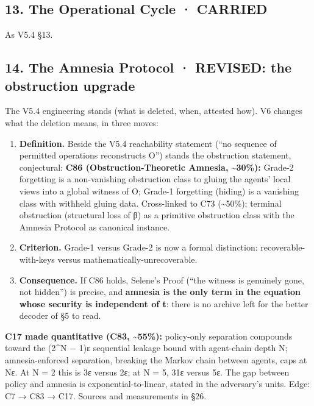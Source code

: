 \documentclass[
  11pt,
]{article}
\providecommand{\tightlist}{%
  \setlength{\itemsep}{0pt}\setlength{\parskip}{0pt}}
\begin{document}
\subsection{13. The Operational Cycle ·
CARRIED}\label{the-operational-cycle-carried}

As V5.4 §13.

\subsection{14. The Amnesia Protocol · REVISED: the obstruction
upgrade}\label{the-amnesia-protocol-revised-the-obstruction-upgrade}

The V5.4 engineering stands (what is deleted, when, attested how). V6
changes what the deletion means, in three moves:

\begin{enumerate}
\def\labelenumi{\arabic{enumi}.}
\tightlist
\item
  \textbf{Definition.} Beside the V5.4 reachability statement (``no
  sequence of permitted operations reconstructs O'') stands the
  obstruction statement, conjectural: \textbf{C86 (Obstruction-Theoretic
  Amnesia, \textasciitilde30\%):} Grade-2 forgetting is a non-vanishing
  obstruction class to gluing the agents' local views into a global
  witness of O; Grade-1 forgetting (hiding) is a vanishing class with
  withheld gluing data. Cross-linked to C73 (\textasciitilde50\%):
  terminal obstruction (structural loss of β) as a primitive obstruction
  class with the Amnesia Protocol as canonical instance.
\item
  \textbf{Criterion.} Grade-1 versus Grade-2 is now a formal
  distinction: recoverable-with-keys versus
  mathematically-unrecoverable.
\item
  \textbf{Consequence.} If C86 holds, Selene's Proof (``the witness is
  genuinely gone, not hidden'') is precise, and \textbf{amnesia is the
  only term in the equation whose security is independent of t}: there
  is no archive left for the better decoder of §5 to read.
\end{enumerate}

\textbf{C17 made quantitative (C83, \textasciitilde55\%):} policy-only
separation compounds toward the (2\^{}N − 1)ε sequential leakage bound
with agent-chain depth N; amnesia-enforced separation, breaking the
Markov chain between agents, caps at Nε. At N = 2 this is 3ε versus 2ε;
at N = 5, 31ε versus 5ε. The gap between policy and amnesia is
exponential-to-linear, stated in the adversary's units. Edge: C7 → C83 →
C17. Sources and measurements in §26.
\end{document}
